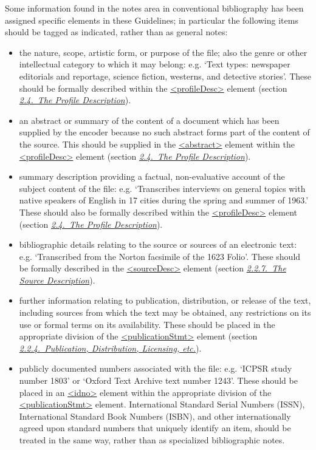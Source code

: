 Some information found in the notes area in conventional bibliography has been assigned specific elements in these Guidelines; in particular the following items should be tagged as indicated, rather than as general notes: \begin{itemize}
\item the nature, scope, artistic form, or purpose of the file; also the genre or other intellectual category to which it may belong: e.g. ‘Text types: newspaper editorials and reportage, science fiction, westerns, and detective stories’. These should be formally described within the \hyperref[TEI.profileDesc]{<profileDesc>} element (section \textit{\hyperref[HD4]{2.4.\ The Profile Description}}).
\item an abstract or summary of the content of a document which has been supplied by the encoder because no such abstract forms part of the content of the source. This should be supplied in the \hyperref[TEI.abstract]{<abstract>} element within the \hyperref[TEI.profileDesc]{<profileDesc>} element (section \textit{\hyperref[HD4]{2.4.\ The Profile Description}}).
\item summary description providing a factual, non-evaluative account of the subject content of the file: e.g. ‘Transcribes interviews on general topics with native speakers of English in 17 cities during the spring and summer of 1963.’ These should also be formally described within the \hyperref[TEI.profileDesc]{<profileDesc>} element (section \textit{\hyperref[HD4]{2.4.\ The Profile Description}}).
\item bibliographic details relating to the source or sources of an electronic text: e.g. ‘Transcribed from the Norton facsimile of the 1623 Folio’. These should be formally described in the \hyperref[TEI.sourceDesc]{<sourceDesc>} element (section \textit{\hyperref[HD3]{2.2.7.\ The Source Description}}).
\item further information relating to publication, distribution, or release of the text, including sources from which the text may be obtained, any restrictions on its use or formal terms on its availability. These should be placed in the appropriate division of the \hyperref[TEI.publicationStmt]{<publicationStmt>} element (section \textit{\hyperref[HD24]{2.2.4.\ Publication, Distribution, Licensing, etc.}}).
\item publicly documented numbers associated with the file: e.g. ‘ICPSR study number 1803’ or ‘Oxford Text Archive text number 1243’. These should be placed in an \hyperref[TEI.idno]{<idno>} element within the appropriate division of the \hyperref[TEI.publicationStmt]{<publicationStmt>} element. International Standard Serial Numbers (ISSN), International Standard Book Numbers (ISBN), and other internationally agreed upon standard numbers that uniquely identify an item, should be treated in the same way, rather than as specialized bibliographic notes.
\end{itemize} \par
